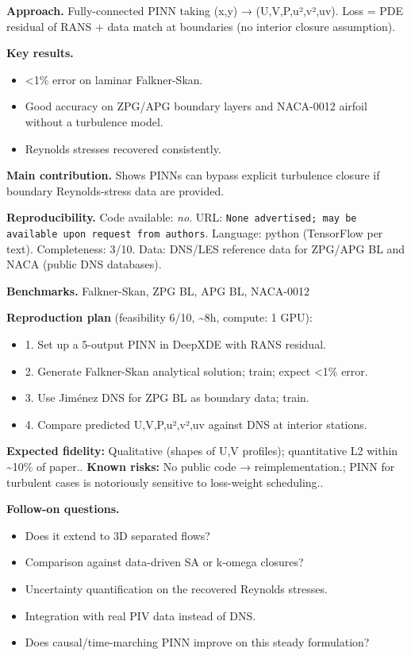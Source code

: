 \documentclass[10pt,letterpaper]{article}
\begin{document}
\textbf{Approach.} Fully-connected PINN taking (x,y) → (U,V,P,u²,v²,uv). Loss = PDE residual of RANS + data match at boundaries (no interior closure assumption).

\textbf{Key results.}
\begin{itemize}
\item <1\% error on laminar Falkner-Skan.
\item Good accuracy on ZPG/APG boundary layers and NACA-0012 airfoil without a turbulence model.
\item Reynolds stresses recovered consistently.
\end{itemize}

\textbf{Main contribution.} Shows PINNs can bypass explicit turbulence closure if boundary Reynolds-stress data are provided.

\textbf{Reproducibility.} Code available: \emph{no}. URL: \texttt{None advertised; may be available upon request from authors}. Language: python (TensorFlow per text). Completeness: 3/10. Data: DNS/LES reference data for ZPG/APG BL and NACA (public DNS databases).

\textbf{Benchmarks.} Falkner-Skan, ZPG BL, APG BL, NACA-0012

\textbf{Reproduction plan} (feasibility 6/10, \textasciitilde8h, compute: 1 GPU):
\begin{itemize}
\item 1. Set up a 5-output PINN in DeepXDE with RANS residual.
\item 2. Generate Falkner-Skan analytical solution; train; expect <1\% error.
\item 3. Use Jiménez DNS for ZPG BL as boundary data; train.
\item 4. Compare predicted U,V,P,u²,v²,uv against DNS at interior stations.
\end{itemize}
\textbf{Expected fidelity:} Qualitative (shapes of U,V profiles); quantitative L2 within \~{}10\% of paper.. \textbf{Known risks:} No public code → reimplementation.; PINN for turbulent cases is notoriously sensitive to loss-weight scheduling..

\textbf{Follow-on questions.}
\begin{itemize}
\item Does it extend to 3D separated flows?
\item Comparison against data-driven SA or k-omega closures?
\item Uncertainty quantification on the recovered Reynolds stresses.
\item Integration with real PIV data instead of DNS.
\item Does causal/time-marching PINN improve on this steady formulation?
\end{itemize}
\end{document}
